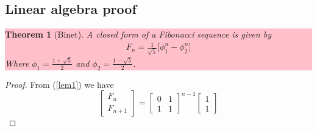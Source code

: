 \documentclass[paper=a4, fontsize=11pt,twoside]{scrartcl}		%
\newtheorem{thm}{Theorem}[section]
\theoremstyle{definition}
\theoremstyle{remark}
\begin{document}
\subsection{Linear algebra proof}
\colorbox{pink}{\parbox{\textwidth}{
\begin{thm}[Binet]
A closed form of a Fibonacci sequence is given by
\begin{align}
F_n=\frac{1}{\sqrt{5}}\biggl[ \phi_1 ^n -\phi_2 ^n\biggl]
\end{align}
Where $\phi_1=\frac{1+\sqrt{5}}{2}$ and $\phi_2=\frac{1-\sqrt{5}}{2}$.
\end{thm}}}
\begin{proof}
From (\ref{lem1}) we have
$$
\left[\begin{matrix} F_n\\ F_{n+1} \end{matrix}\right] = \left[ \begin{matrix} 0   & 1 \\ 1  & 1 \end{matrix}\right]^{n-1} \left[\begin{matrix} 1\\ 1 \end{matrix}\right]
$$


\end{proof}
\end{document}
